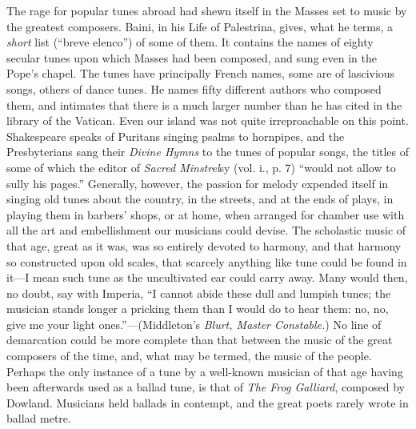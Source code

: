 The rage for popular tunes abroad had shewn itself in the Masses set to
music by the greatest composers. Baini, in his Life of Palestrina, gives, what
he terms, a \textit{short} list (“breve elenco”) of some of them. It contains the
names of eighty secular tunes upon which Masses had been composed, and sung
even in the Pope’s chapel. The tunes have principally French names, some
are of lascivious songs, others of dance tunes. He names fifty different authors
who composed them, and intimates that there is a much larger number than he
has cited in the library of the Vatican.
 Even our island was not quite irreproachable
on this point. Shakespeare speaks of Puritans singing psalms to
hornpipes, and the Presbyterians sang their \textit{Divine Hymns} to the tunes of
popular songs, the titles of some of which the editor of \textit{Sacred Minstrel}sy (vol. i.,
p. 7) “would not allow to sully his pages.” Generally, however, the passion
for melody expended itself in singing old tunes about the country, in the streets,
and at the ends of plays, in playing them in barbers’ shops, or at home, when
arranged for chamber use with all the art and embellishment our musicians could
devise. The scholastic music of that age, great as it was, was so entirely devoted
to harmony, and that harmony so constructed upon old scales, that scarcely anything
like tune could be found in it—I mean such tune as the uncultivated ear
could carry away. Many would then, no doubt, say with Imperia, “I cannot abide
these dull and lumpish tunes; the musician stands longer a pricking them than
I would do to hear them: no, no, give me your light ones.”—(Middleton’s \textit{Blurt,
Master Constable.}) No line of demarcation could be more complete than that
between the music of the great composers of the time, and, what may be termed,
the music of the people. Perhaps the only instance of a tune by a well-known
musician of that age having been afterwards used as a ballad tune, is that of \textit{The
Frog Galliard}, composed by Dowland. Musicians held ballads in contempt, and
the great poets rarely wrote in ballad metre.


